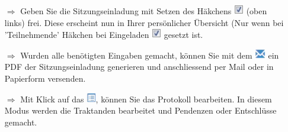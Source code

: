 \documentclass{article}
\begin{document}
\begin{multicols}{2}
\begin{tcolorbox}[colback=blue!5,colframe=blue!40!black,title=Eine Einladung bearbeiten / versenden]
\begin{itemize}
  \item[$\Longrightarrow$] Geben Sie die Sitzungseinladung mit Setzen des Häkchens \includegraphics[height=12pt]{Icons/sbox_ok.png} (oben links) frei. Diese erscheint nun in Ihrer persönlicher Übersicht (Nur wenn bei 'Teilnehmende' Häkchen bei Eingeladen \includegraphics[height=12pt]{Icons/sbox_ok.png} gesetzt ist.
  \item[$\Longrightarrow$] Wurden alle benötigten Eingaben gemacht, können Sie mit dem \includegraphics[height=12pt]{Icons/Briefsymbol.png} ein PDF der Sitzungseinladung generieren und anschliessend per Mail oder in Papierform versenden.
  \item[$\Longrightarrow$] Mit Klick auf das \includegraphics[height=12pt]{Icons/Listensymbol.png}, können Sie das Protokoll bearbeiten. In diesem Modus werden die Traktanden bearbeitet und Pendenzen oder Entschlüsse gemacht.		
\end{itemize}
\end{tcolorbox}


\end{multicols}

\end{document}
